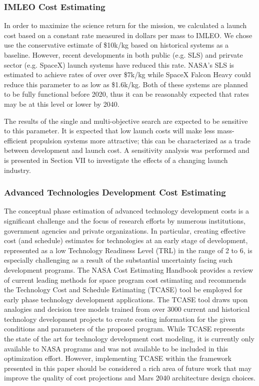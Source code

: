 \documentclass[]{aiaa-pretty}
\begin{document}
\subsubsection{IMLEO Cost Estimating}
In order to maximize the science return for the mission, we calculated a launch cost based on a constant rate measured in dollars per mass to IMLEO. We chose use the conservative estimate of \$10k/kg based on historical systems as a baseline. However, recent developments in both public (e.g. SLS) and prirvate sector (e.g. SpaceX) launch systems have reduced this rate. NASA’s SLS is estimated to achieve rates of over over \$7k/kg while SpaceX Falcon Heavy could reduce this parameter to as low as \$1.6k/kg. \cite{jones2015estimating} Both of these systems are planned to be fully functional before 2020, thus it can be reasonably expected that rates may be at this level or lower by 2040. 

The results of the single and multi-objective search are expected to be sensitive to this parameter. It is expected that low launch costs will make less mass-efficient propulsion systems more attractive; this can be characterized as a trade between development and launch cost. A sensitivity analysis was performed and is presented in Section VII to investigate the effects of a changing launch industry. 	

\subsubsection{Advanced Technologies Development Cost Estimating}
The conceptual phase estimation of advanced technology development costs is a significant challenge and the focus of research efforts by numerous institutions, government agencies and private organizations. In particular, creating effective cost (and schedule) estimates for technologies at an early stage of development, represented as a low Technology Readiness Level (TRL) in the range of 2 to 6, is especially challenging as a result of the substantial uncertainty facing such development programs. \cite{cole2013technology} The NASA Cost Estimating Handbook provides a review of current leading methods for space program cost estimating and recommends the Technology Cost and Schedule Estimating (TCASE) tool be employed for early phase technology development applications. \cite{nasa2015handbook} The TCASE tool draws upon analogies and decision tree models trained from over 3000 current and historical technology development projects to create costing information for the given conditions and parameters of the proposed program. While TCASE represents the state of the art for technology development cost modeling, it is currently only available to NASA programs and was not available to be included in this optimization effort. However, implementing TCASE within the framework presented in this paper should be considered a rich area of future work that may improve the quality of cost projections and Mars 2040 architecture design choices. 
\end{document}
